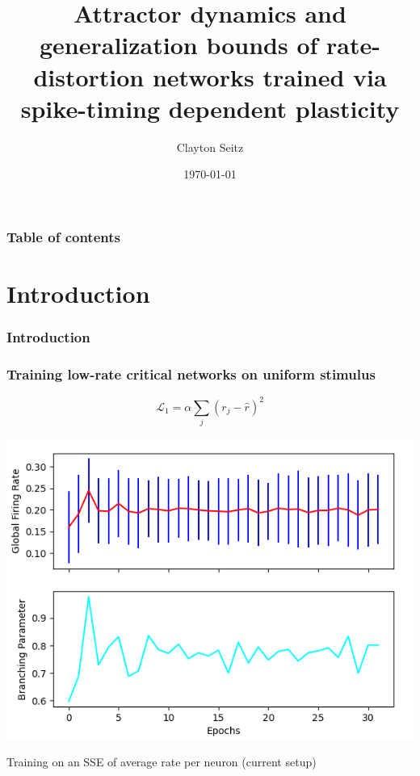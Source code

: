 \documentclass{beamer}
\begin{document}
\title{Attractor dynamics and generalization bounds of rate-distortion networks trained via spike-timing dependent plasticity}  
\author{Clayton Seitz}
\date{\today} 

\begin{frame}[plain]
\titlepage
\end{frame}

\begin{frame}[plain]\frametitle{Table of contents}\tableofcontents
\end{frame} 

\section{Introduction} 

\begin{frame}[plain]
\frametitle{Introduction} 

\end{frame}

\begin{frame}[plain]
\frametitle{Training low-rate critical networks on uniform stimulus} 

\begin{equation*}
\mathcal{L}_{1} = \alpha \sum_{j} (r_{j} - \hat{r})^{2}
\end{equation*}

\begin{center}
\includegraphics[scale=0.5]{sse-vars}
\end{center}

Training on an SSE of average rate per neuron (current setup)

\end{frame}
\end{document}
